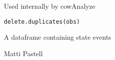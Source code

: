 \begin{Description}\relax
Used internally by cowAnalyze
\end{Description}
\begin{Usage}
\begin{verbatim}
delete.duplicates(obs)
\end{verbatim}
\end{Usage}
\begin{Arguments}
\begin{ldescription}
\item[\code{obs}] A dataframe containing state events
\end{ldescription}
\end{Arguments}
\begin{Author}\relax
Matti Pastell
\end{Author}

